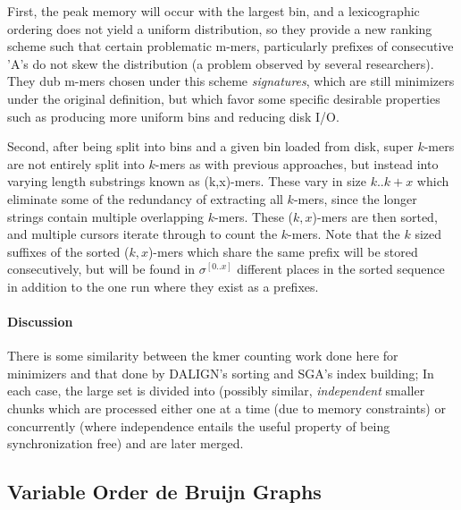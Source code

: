 First, the peak memory will occur with the largest bin, and a lexicographic ordering does not yield a uniform distribution, so they provide a new ranking scheme such that certain problematic m-mers, particularly prefixes of consecutive 'A's do not skew the distribution (a problem observed by several researchers).
They dub m-mers chosen under this scheme \emph{signatures}, which are still minimizers under the original definition, but which favor some specific desirable properties such as producing more uniform bins and reducing disk I/O.


Second, after being split into bins and a given bin loaded from disk, super $k$-mers are not entirely split into $k$-mers as with previous approaches, but instead into varying length substrings known as (k,x)-mers.
These vary in size $k$..$k+x$ which eliminate some of the redundancy of extracting all $k$-mers, since the longer strings contain multiple overlapping $k$-mers.
These ($k,x$)-mers are then sorted, and multiple cursors iterate through to count the $k$-mers.
Note that the $k$ sized suffixes of the sorted ($k,x$)-mers which share the same prefix will be stored consecutively, but will be found in $\sigma^{[0..x]}$ different places in the sorted sequence in addition to the one run where they exist as a prefixes.


\paragraph{Discussion}

There is some similarity between the kmer counting work done here for minimizers and that done by DALIGN's sorting and SGA's index building; In each case, the large set is divided into (possibly similar, \emph{independent} smaller chunks which are processed either one at a time (due to memory constraints) or concurrently (where independence entails the useful property of being synchronization free) and are later merged.

\subsection{Variable Order de Bruijn Graphs}

